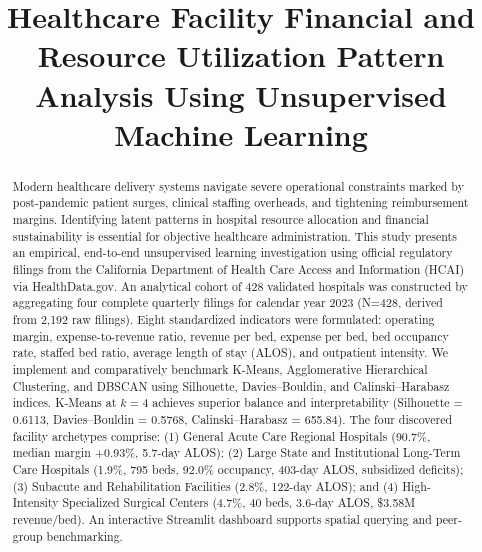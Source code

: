 \documentclass[conference]{IEEEtran}
\begin{document}
\title{Healthcare Facility Financial and Resource Utilization Pattern Analysis Using Unsupervised Machine Learning}

\author{
}

\maketitle

\begin{abstract}
Modern healthcare delivery systems navigate severe operational constraints marked by post-pandemic patient surges, clinical staffing overheads, and tightening reimbursement margins. Identifying latent patterns in hospital resource allocation and financial sustainability is essential for objective healthcare administration. This study presents an empirical, end-to-end unsupervised learning investigation using official regulatory filings from the California Department of Health Care Access and Information (HCAI) via HealthData.gov. An analytical cohort of 428 validated hospitals was constructed by aggregating four complete quarterly filings for calendar year 2023 (N=428, derived from 2,192 raw filings). Eight standardized indicators were formulated: operating margin, expense-to-revenue ratio, revenue per bed, expense per bed, bed occupancy rate, staffed bed ratio, average length of stay (ALOS), and outpatient intensity. We implement and comparatively benchmark K-Means, Agglomerative Hierarchical Clustering, and DBSCAN using Silhouette, Davies--Bouldin, and Calinski--Harabasz indices. K-Means at $k=4$ achieves superior balance and interpretability (Silhouette = 0.6113, Davies--Bouldin = 0.5768, Calinski--Harabasz = 655.84). The four discovered facility archetypes comprise: (1) General Acute Care Regional Hospitals (90.7\%, median margin +0.93\%, 5.7-day ALOS); (2) Large State and Institutional Long-Term Care Hospitals (1.9\%, 795 beds, 92.0\% occupancy, 403-day ALOS, subsidized deficits); (3) Subacute and Rehabilitation Facilities (2.8\%, 122-day ALOS); and (4) High-Intensity Specialized Surgical Centers (4.7\%, 40 beds, 3.6-day ALOS, \$3.58M revenue/bed). An interactive Streamlit dashboard supports spatial querying and peer-group benchmarking.
\end{abstract}
\end{document}
